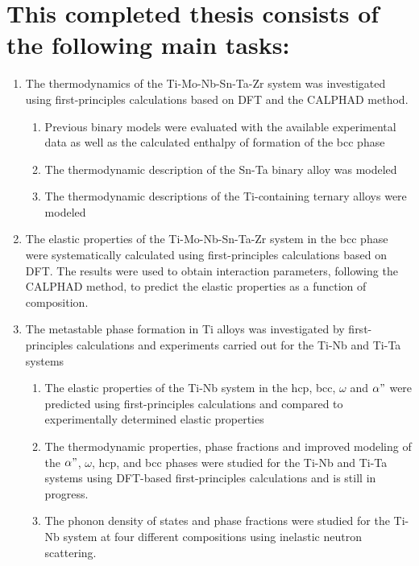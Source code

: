 \pagebreak
\section*{This completed thesis consists of the following main tasks:}

\begin{enumerate}
	\item The thermodynamics of the Ti-Mo-Nb-Sn-Ta-Zr system was investigated using first-principles calculations based on DFT and the CALPHAD method. 
	\begin{enumerate}
		\item Previous binary models were evaluated with the available experimental data as well as the calculated enthalpy of formation of the bcc phase 
		\item The thermodynamic description of the Sn-Ta binary alloy was modeled
		\item The thermodynamic descriptions of the Ti-containing ternary alloys were modeled
	\end{enumerate}
	\item The elastic properties of the Ti-Mo-Nb-Sn-Ta-Zr system in the bcc phase were systematically calculated using first-principles calculations based on DFT. The results were used to obtain interaction parameters, following the CALPHAD method, to predict the elastic properties as a function of composition. 
	\item The metastable phase formation in Ti alloys was investigated by first-principles calculations and experiments carried out for the Ti-Nb and Ti-Ta systems
	\begin{enumerate}
		\item The elastic properties of the Ti-Nb system in the hcp, bcc, $\omega$ and $\alpha"$ were predicted using first-principles calculations and compared to experimentally determined elastic properties
		\item The thermodynamic properties, phase fractions and improved modeling of the $\alpha"$, $\omega$, hcp, and bcc phases were studied for the Ti-Nb and Ti-Ta systems using DFT-based first-principles calculations and is still in progress.
		\item The phonon density of states and phase fractions were studied for the Ti-Nb system at four different compositions using inelastic neutron scattering.
	\end{enumerate} 
\end{enumerate}
		
